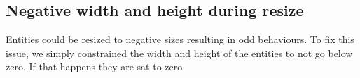 \subsection{Negative width and height during resize}
Entities could be resized to negative sizes resulting in odd behaviours. To fix this issue, we simply constrained the width and height of the entities to not go below zero. If that happens they are sat to zero.